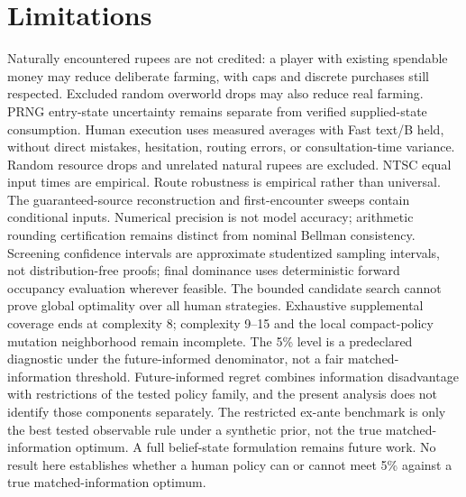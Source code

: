 \documentclass[11pt]{article}
\theoremstyle{definition}\newtheorem{definition}[theorem]{Definition}
\begin{document}
\section{Limitations}
Naturally encountered rupees are not credited: a player with existing spendable money may reduce deliberate farming, with caps and discrete purchases still respected. Excluded random overworld drops may also reduce real farming. PRNG entry-state uncertainty remains separate from verified supplied-state consumption. Human execution uses measured averages with Fast text/B held, without direct mistakes, hesitation, routing errors, or consultation-time variance. Random resource drops and unrelated natural rupees are excluded. NTSC equal input times are empirical. Route robustness is empirical rather than universal. The guaranteed-source reconstruction and first-encounter sweeps contain conditional inputs. Numerical precision is not model accuracy; arithmetic rounding certification remains distinct from nominal Bellman consistency. Screening confidence intervals are approximate studentized sampling intervals, not distribution-free proofs; final dominance uses deterministic forward occupancy evaluation wherever feasible. The bounded candidate search cannot prove global optimality over all human strategies. Exhaustive supplemental coverage ends at complexity 8; complexity 9--15 and the local compact-policy mutation neighborhood remain incomplete. The 5\% level is a predeclared diagnostic under the future-informed denominator, not a fair matched-information threshold. Future-informed regret combines information disadvantage with restrictions of the tested policy family, and the present analysis does not identify those components separately. The restricted ex-ante benchmark is only the best tested observable rule under a synthetic prior, not the true matched-information optimum. A full belief-state formulation remains future work. No result here establishes whether a human policy can or cannot meet 5\% against a true matched-information optimum.
\end{document}
